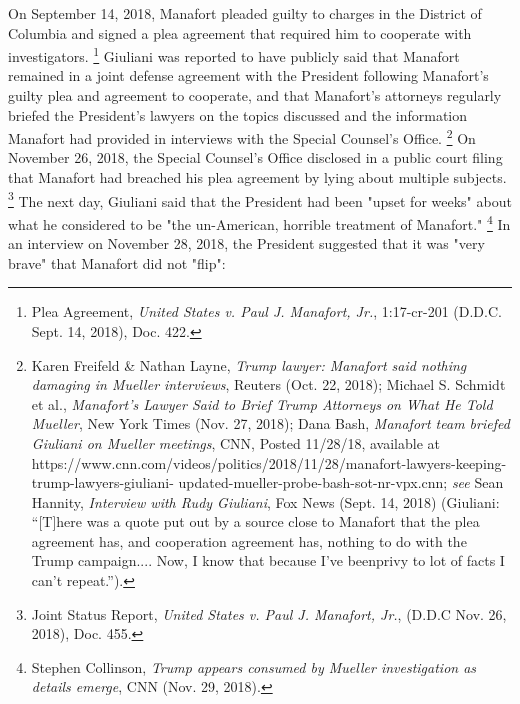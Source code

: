 {On September 14, 2018, Manafort pleaded guilty to charges in the District of Columbia and signed a plea agreement that required him to cooperate with investigators.%
\footnote{Plea Agreement, \textit{United States v. Paul J. Manafort, Jr.}, 1:17-cr-201 (D.D.C. Sept. 14, 2018), Doc. 422.}
Giuliani was reported to have publicly said that Manafort remained in a joint defense agreement with the President following Manafort's guilty plea and agreement to cooperate, and that Manafort's attorneys regularly briefed the President's lawyers on the topics discussed and the information Manafort had provided in interviews with the Special Counsel's Office.%
\footnote{Karen Freifeld \& Nathan Layne, \textit{Trump lawyer: Manafort said nothing damaging in Mueller interviews}, Reuters (Oct. 22, 2018);
Michael S. Schmidt et al., \textit{Manafort’s Lawyer Said to Brief Trump Attorneys on What He Told Mueller}, New York Times (Nov. 27, 2018);
Dana Bash, \textit{Manafort team briefed Giuliani on Mueller meetings}, CNN, Posted 11/28/18, available at
https://www.cnn.com/videos/politics/2018/11/28/manafort-lawyers-keeping-trump-lawyers-giuliani- updated-mueller-probe-bash-sot-nr-vpx.cnn;
\textit{see} Sean Hannity, \textit{Interview with Rudy Giuliani}, Fox News (Sept. 14, 2018) (Giuliani: “[T]here was a quote put out by a source close to Manafort that the plea agreement has, and cooperation agreement has, nothing to do with the Trump campaign....
Now, I know that because I’ve beenprivy to lot of facts I can’t repeat.”).}
On November 26, 2018, the Special Counsel's Office disclosed in a public court filing that Manafort had breached his plea agreement by lying about multiple subjects.%
\footnote{Joint Status Report, \textit{United States v. Paul J. Manafort, Jr.}, (D.D.C Nov. 26, 2018), Doc. 455.}
The next day, Giuliani said that the President had been "upset for weeks" about what he considered to be "the un-American, horrible treatment of Manafort."%
\footnote{Stephen Collinson, \textit{Trump appears consumed by Mueller investigation as details emerge}, CNN (Nov. 29, 2018).}
In an interview on November 28, 2018, the President suggested that it was "very brave" that Manafort did not "flip":

}
